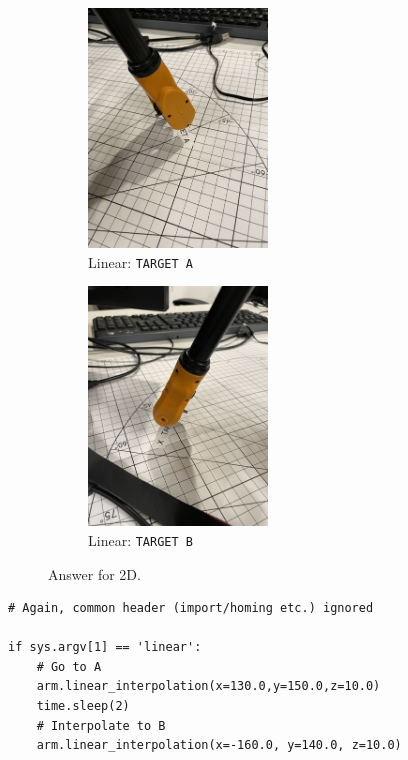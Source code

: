 \newpage
\begin{figure}[hb!]
     \centering
    \begin{subfigure}[b]{0.3\textwidth}
        \includegraphics[height=2.5in]{image/2d_linear_a.jpg}
         \caption*{Linear: \texttt{TARGET A}}
     \end{subfigure}
     \hfill
     \begin{subfigure}[b]{0.3\textwidth}
        \includegraphics[height=2.5in]{image/2d_linear_b.jpg}
         \caption*{Linear: \texttt{TARGET B}}
     \end{subfigure}
    \caption*{Answer for 2D.}
\end{figure}
%
\begin{verbatim}
# Again, common header (import/homing etc.) ignored

if sys.argv[1] == 'linear':
    # Go to A
    arm.linear_interpolation(x=130.0,y=150.0,z=10.0)
    time.sleep(2)
    # Interpolate to B
    arm.linear_interpolation(x=-160.0, y=140.0, z=10.0)
\end{verbatim}

